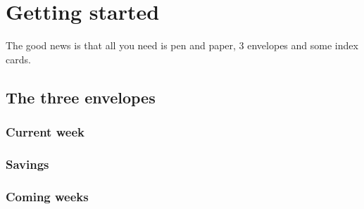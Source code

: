 \section{Getting started}

The good news is that all you need is pen and paper, 3 envelopes and some index cards.

\subsection{The three envelopes} %

\subsubsection{Current week}

\subsubsection{Savings}

\subsubsection{Coming weeks}